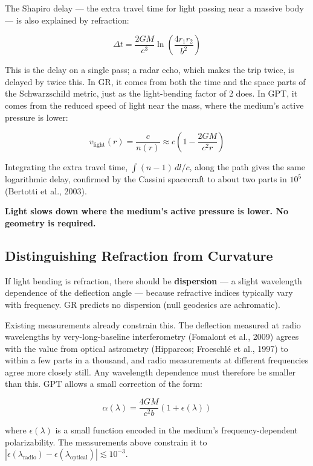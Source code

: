 \documentclass[12pt, a4paper]{article}
\begin{document}
The Shapiro delay — the extra travel time for light passing near a massive body — is also explained by refraction:

\[
\Delta t = \frac{2GM}{c^3} \ln \left( \frac{4r_1 r_2}{b^2} \right)
\]

This is the delay on a single pass; a radar echo, which makes the trip twice, is delayed by twice this. In GR, it comes from both the time and the space parts of the Schwarzschild metric, just as the light-bending factor of 2 does. In GPT, it comes from the reduced speed of light near the mass, where the medium's active pressure is lower:

\[
v_{\text{light}}(r) = \frac{c}{n(r)} \approx c \left(1 - \frac{2GM}{c^2 r}\right)
\]

Integrating the extra travel time, \( \int (n-1)\,dl/c \), along the path gives the same logarithmic delay, confirmed by the Cassini spacecraft to about two parts in \( 10^5 \) (Bertotti et al., 2003).

\textbf{Light slows down where the medium's active pressure is lower. No geometry is required.}

\subsection{Distinguishing Refraction from Curvature}
\label{subsec:dispersion_test}

If light bending is refraction, there should be \textbf{dispersion} — a slight wavelength dependence of the deflection angle — because refractive indices typically vary with frequency. GR predicts no dispersion (null geodesics are achromatic).

Existing measurements already constrain this. The deflection measured at radio wavelengths by very-long-baseline interferometry (Fomalont et al., 2009) agrees with the value from optical astrometry (Hipparcos; Froeschl\'e et al., 1997) to within a few parts in a thousand, and radio measurements at different frequencies agree more closely still. Any wavelength dependence must therefore be smaller than this. GPT allows a small correction of the form:

\[
\alpha(\lambda) = \frac{4GM}{c^2 b} \left(1 + \epsilon(\lambda) \right)
\]

where \( \epsilon(\lambda) \) is a small function encoded in the medium's frequency-dependent polarizability. The measurements above constrain it to \( |\epsilon(\lambda_{\text{radio}}) - \epsilon(\lambda_{\text{optical}})| \lesssim 10^{-3} \). 
\end{document}
